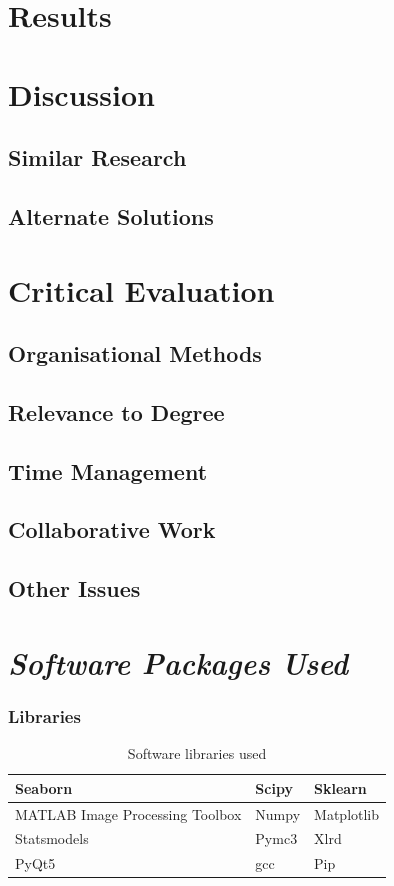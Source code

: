 \documentclass[11pt]{report}
\begin{document}
\chapter{Results}
\label{sec:orge22d13b}
\chapter{Discussion}
\label{sec:orgf07c56e}
\section{Similar Research}
\label{sec:org21fcfbd}
\section{Alternate Solutions}
\label{sec:org0839933}
\chapter{Critical Evaluation}
\label{sec:org83c95cd}
\section{Organisational Methods}
\label{sec:org2890631}
\section{Relevance to Degree}
\label{sec:orga806628}
\section{Time Management}
\label{sec:org46b060e}
\section{Collaborative Work}
\label{sec:org1824f74}
\section{Other Issues}
\label{sec:org85bd064}


\appendix
\chapter{\emph{Software Packages Used}}
\label{sec:orgbe79989}
\subsection{Libraries}
\label{sec:orgc06992b}
\begin{table}[htbp]
\caption{\label{tab:org9cf28b5}
Software libraries used}
\centering
\begin{tabularx}{\textwidth}{|X|X|X|}
\hline
Seaborn & Scipy & Sklearn\\
\hline
MATLAB Image Processing Toolbox & Numpy & Matplotlib\\
\hline
Statsmodels & Pymc3 & Xlrd\\
\hline
PyQt5 & gcc & Pip\\
\hline
\end{tabularx}
\end{table}
\end{document}
